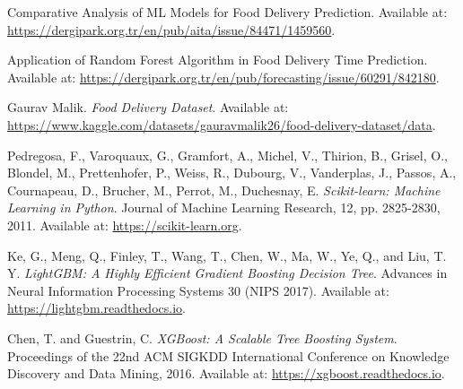 \documentclass[10pt,twocolumn,letterpaper]{article}
\begin{document}
\begin{thebibliography}{9}

        Comparative Analysis of ML Models for Food Delivery Prediction.
        Available at: \url{https://dergipark.org.tr/en/pub/aita/issue/84471/1459560}.

        Application of Random Forest Algorithm in Food Delivery Time Prediction.
        Available at: \url{https://dergipark.org.tr/en/pub/forecasting/issue/60291/842180}.

        Gaurav Malik.
        \emph{Food Delivery Dataset}.
        Available at: \url{https://www.kaggle.com/datasets/gauravmalik26/food-delivery-dataset/data}.

        Pedregosa, F., Varoquaux, G., Gramfort, A., Michel, V., Thirion, B., Grisel, O., Blondel, M., Prettenhofer, P., Weiss, R., Dubourg, V., Vanderplas, J., Passos, A., Cournapeau, D., Brucher, M., Perrot, M., Duchesnay, E.
        \emph{Scikit-learn: Machine Learning in Python}.
        Journal of Machine Learning Research, 12, pp. 2825-2830, 2011.
        Available at: \url{https://scikit-learn.org}.

        Ke, G., Meng, Q., Finley, T., Wang, T., Chen, W., Ma, W., Ye, Q., and Liu, T. Y.
        \emph{LightGBM: A Highly Efficient Gradient Boosting Decision Tree}.
        Advances in Neural Information Processing Systems 30 (NIPS 2017).
        Available at: \url{https://lightgbm.readthedocs.io}.

        Chen, T. and Guestrin, C.
        \emph{XGBoost: A Scalable Tree Boosting System}.
        Proceedings of the 22nd ACM SIGKDD International Conference on Knowledge Discovery and Data Mining, 2016.
        Available at: \url{https://xgboost.readthedocs.io}.

\end{thebibliography}
\end{document}
